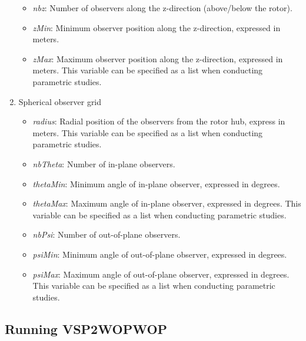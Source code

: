 \documentclass[journal ]{new-aiaa}
\begin{document}
\begin{enumerate}
\begin{itemize}
\item \textit{nbz}: Number of observers along the z-direction (above/below the rotor).
\item \textit{zMin}: Minimum observer position along the z-direction, expressed in meters. 
\item \textit{zMax}: Maximum observer position along the z-direction, expressed in meters. This variable can be specified as a list when conducting parametric studies. 
\end{itemize}
\item Spherical observer grid 
\begin{itemize}
\item \textit{radius}: Radial position of the observers from the rotor hub, express in meters. This variable can be specified as a list when conducting parametric studies. 
\item \textit{nbTheta}: Number of in-plane observers. 
\item \textit{thetaMin}: Minimum angle of in-plane observer, expressed in degrees. 
\item \textit{thetaMax}: Maximum angle of in-plane observer, expressed in degrees. This variable can be specified as a list when conducting parametric studies.
\item \textit{nbPsi}: Number of out-of-plane observers. 
\item \textit{psiMin}: Minimum angle of out-of-plane observer, expressed in degrees. 
\item \textit{psiMax}: Maximum angle of out-of-plane observer, expressed in degrees. This variable can be specified as a list when conducting parametric studies.
\end{itemize}

\end {enumerate}



\subsection{Running VSP2WOPWOP}

\end{document}
